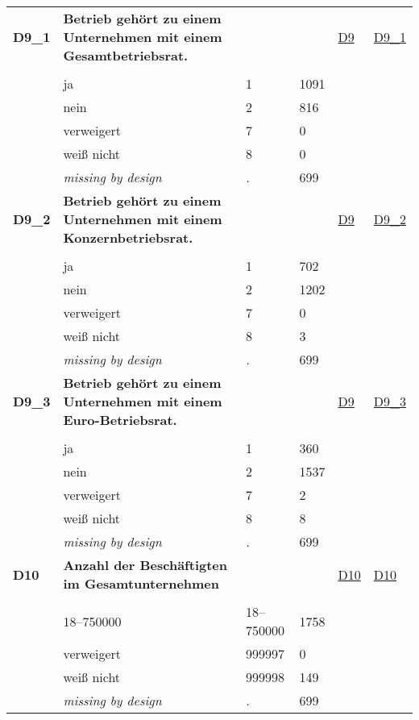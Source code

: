 \begin{longtable}{| L{2.45cm} | L{6cm} | C{1.5cm} | R{1cm} | C{2.25cm} | C{2.25cm} |}
   \midrule
\textbf{D9\_1}\label{var:D9:1} & \textbf{Betrieb gehört zu einem Unternehmen mit einem Gesamtbetriebsrat.} &  &  & \hyperref[D9]{D9} & \hyperref[var:suf:D9:1]{D9\_1} \\ 
   &  &  &  &  &  \\ 
   & ja & 1 & 1091 &  &  \\ 
   & nein & 2 & 816 &  &  \\ 
   & verweigert & 7 & 0 &  &  \\ 
   & weiß nicht & 8 & 0 &  &  \\ 
   & \textit{missing by design} & \textit{.} & 699 &  &  \\ 
   \midrule
\textbf{D9\_2}\label{var:D9:2} & \textbf{Betrieb gehört zu einem Unternehmen mit einem Konzernbetriebsrat.} &  &  & \hyperref[D9]{D9} & \hyperref[var:suf:D9:2]{D9\_2} \\ 
   &  &  &  &  &  \\ 
   & ja & 1 & 702 &  &  \\ 
   & nein & 2 & 1202 &  &  \\ 
   & verweigert & 7 & 0 &  &  \\ 
   & weiß nicht & 8 & 3 &  &  \\ 
   & \textit{missing by design} & \textit{.} & 699 &  &  \\ 
   \midrule
\textbf{D9\_3}\label{var:D9:3} & \textbf{Betrieb gehört zu einem Unternehmen mit einem Euro-Betriebsrat.} &  &  & \hyperref[D9]{D9} & \hyperref[var:suf:D9:3]{D9\_3} \\ 
   &  &  &  &  &  \\ 
   & ja & 1 & 360 &  &  \\ 
   & nein & 2 & 1537 &  &  \\ 
   & verweigert & 7 & 2 &  &  \\ 
   & weiß nicht & 8 & 8 &  &  \\ 
   & \textit{missing by design} & \textit{.} & 699 &  &  \\ 
   \midrule
\textbf{D10}\label{var:D10} & \textbf{Anzahl der Beschäftigten im Gesamtunternehmen} &  &  & \hyperref[D10]{D10} & \hyperref[var:suf:D10]{D10} \\ 
   &  &  &  &  &  \\ 
   & 18--750000 & 18--750000 & 1758 &  &  \\ 
   & verweigert & 999997 & 0 &  &  \\ 
   & weiß nicht & 999998 & 149 &  &  \\ 
   & \textit{missing by design} & \textit{.} & 699 &  &  \\ 

\end{longtable}
